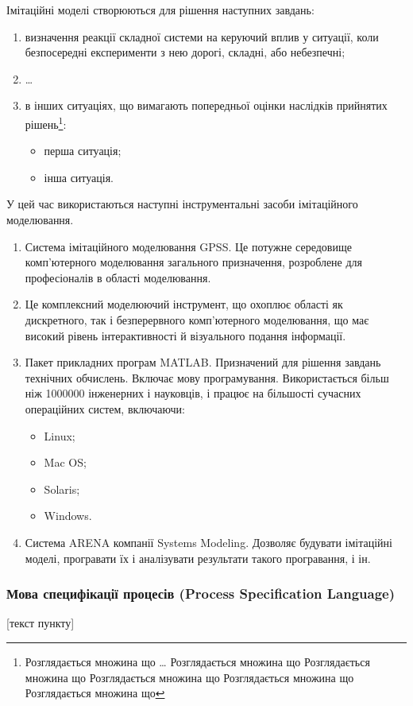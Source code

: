 Імітаційні моделі створюються для рішення наступних завдань:
\begin{enumerate}
\item визначення реакції складної системи на керуючий вплив у ситуації, коли безпосередні експерименти з нею дорогі, складні, або небезпечні;
\item \dots
\item в інших ситуаціях, що вимагають попередньої оцінки наслідків прийнятих
рішень\footnote{Розглядається множина що … Розглядається множина що
Розглядається множина що Розглядається множина що Розглядається множина що
Розглядається множина що}:
\begin{itemize}
\item перша ситуація;
\item інша ситуація.
\end{itemize}
\end{enumerate}
У цей час використаються наступні інструментальні засоби імітаційного моделювання.
\begin{enumerate}
\item Система імітаційного моделювання GPSS. Це потужне середовище комп'ютерного моделювання загального призначення, розроблене для професіоналів в області моделювання. 
\item Це комплексний моделюючий інструмент, що охоплює області як дискретного, так і безперервного комп'ютерного моделювання, що має високий рівень інтерактивності й візуального подання інформації.
\item Пакет прикладних програм MATLAB. Призначений для рішення завдань технічних обчислень. Включає мову програмування. Використається більш ніж 1000000 інженерних і науковців, і працює на більшості сучасних операційних систем, включаючи:
\begin{itemize}
\item Linux; 
\item Mac OS; 
\item Solaris; 
\item Windows.
\end{itemize}
\item Система ARENA компанії Systems Modeling. Дозволяє будувати імітаційні моделі, програвати їх і аналізувати результати такого програвання, і ін.
\end{enumerate}

\subsubsection{Мова специфікації процесів (Process Specification Language)}
[текст пункту]
